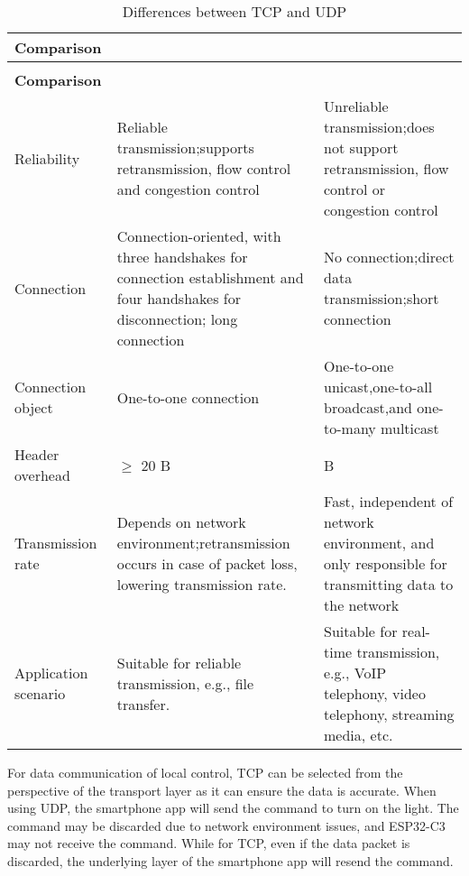 \documentclass[a4paper,12pt]{book}
\begin{document}
{\renewcommand{\arraystretch}{1.2}
\begin{longtable}{|>{\Centering}m{6em}|>{\RaggedRight}m{16em}|>{\RaggedRight}m{16em}|}
    \caption{Differences between TCP and UDP \label{8.3}} \\
        
    \hline
    \rowcolor{LightBlue} \textbf{Comparison}&\multicolumn{1}{c|}{\textbf{TCP}}&\multicolumn{1}{c|}{\textbf{UDP}}\\
    \hline
    \endfirsthead

    \multicolumn{3}{r}{Continuation of Table \ref{8.3}}\\
    \hline
    \rowcolor{LightBlue} \textbf{Comparison}&\multicolumn{1}{c|}{\textbf{TCP}}&\multicolumn{1}{c|}{\textbf{UDP}}\\
    \hline
    \endhead
        
    Reliability&Reliable transmission;\newline supports retransmission, flow control and congestion control&Unreliable transmission;\newline does not support retransmission, flow control or congestion control\\
    \hline
    Connection&Connection-oriented, with three handshakes for connection establishment and four handshakes for disconnection; long connection&No connection;\newline direct data transmission;\newline short connection\\
    \hline
    Connection object&One-to-one connection&One-to-one unicast,\newline one-to-all broadcast,\newline and one-to-many multicast\\
    \hline
    Header overhead&$\geq$ 20 B&8 B\\
    \hline
    Transmission rate&Depends on network environment;\newline retransmission occurs in case of packet loss, lowering transmission rate.&Fast, independent of network environment, and only responsible for transmitting data to the network\\
    \hline
    Application scenario&Suitable for reliable transmission, e.g., file transfer.&Suitable for real-time transmission, e.g., VoIP telephony, video telephony, streaming media, etc.\\
    \hline
\end{longtable}
}

For data communication of local control, TCP can be selected from the perspective of the transport layer as it can ensure the data is accurate. When using UDP, the smartphone app will send the command to turn on the light. The command may be discarded due to network environment issues, and ESP32-C3 may not receive the command. While for TCP, even if the data packet is discarded, the underlying layer of the smartphone app will resend the command.
\end{document}
